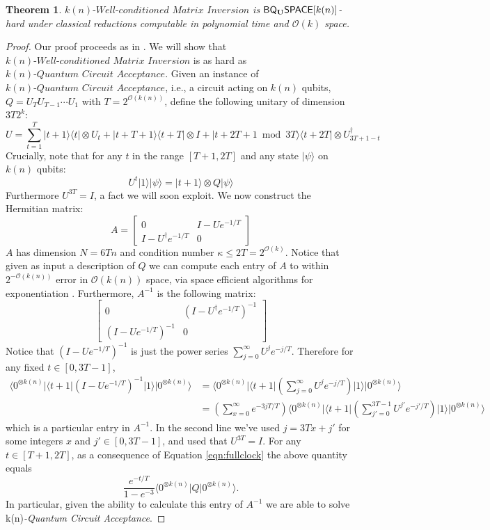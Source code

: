 \documentclass[11pt]{article}
\newtheorem{theorem}{Theorem}
\theoremstyle{definition}
\theoremstyle{remark}
\theoremstyle{definition}
\newcommand\matrixinvert[1]{{\ensuremath{#1}}\textit{-Well-conditioned Matrix Inversion}}
\newcommand\qca[1]{#1\textit{-Quantum Circuit Acceptance}}
\newcommand{\zero}{\ensuremath{0^{\otimes{k(n)}}}}
\newcommand{\classfont}{\sf}
\newcommand{\Unitary}{\mathbf{U}}
\newcommand{\unitaryBQSPACE}[1]{{\classfont{BQ}_\Unitary\classfont{SPACE}}[#1]}
\newcommand\bigoh{\mathcal{O}}
\begin{document}
\begin{theorem}
$\matrixinvert{k(n)}$ is $\unitaryBQSPACE{k(n)}$-hard under classical reductions computable in polynomial time and $\bigoh (k)$ space.
\end{theorem}
\begin{proof}
Our proof proceeds as in \cite{HHL}.  We will show that $\matrixinvert{k(n)}$ is as hard as $\qca{k(n)}$.  Given an instance of $\qca{k(n)}$, i.e., a circuit acting on $k(n)$ qubits, $Q=U_TU_{T-1}\cdots U_1$ with $T = 2^{\mathcal{O}(k(n))}$, define the following unitary of dimension $3T2^k$:
\[U=\sum_{t=1}^{T}|t+1\rangle\langle t|\otimes U_t+|t+T+1\rangle\langle t+T|\otimes I+|t+2T+1\bmod{3T}\rangle\langle t+2T|\otimes U_{3T+1-t}^{\dagger}\]	
Crucially, note that for any $t$ in the range $[T+1,2T]$ and any state $|\psi\rangle$ on $k(n)$ qubits: 
\begin{equation}\label{eqn:fullclock}
	U^t|1\rangle|\psi\rangle=|t+1\rangle\otimes Q|\psi\rangle
\end{equation}
Furthermore $U^{3T}=I$, a fact we will soon exploit. We now construct the Hermitian matrix:
\begin{equation}
A=\begin{bmatrix}
    0 & I-Ue^{-1/T}\\
   I-U^{\dagger}e^{-1/T} &  0
\end{bmatrix}
\end{equation}
 $A$ has dimension $N=6Tn$ and condition number $\kappa\leq 2T=2^{\bigoh (k)}$.  Notice that given as input a description of $Q$ we can compute each entry of $A$ to within $2^{-\mathcal{O}(k(n))}$ error in $\mathcal{O}(k(n))$ space, via space efficient algorithms for exponentiation \cite{reif}.
   Furthermore, $A^{-1}$ is the following matrix:
\begin{equation}
\begin{bmatrix}
    0 & \left(I-U^\dagger e^{-1/T}\right)^{-1}\\
   \left(I-Ue^{-1/T}\right)^{-1} &  0
\end{bmatrix}
\end{equation}
 Notice that $\left(I-Ue^{-1/T}\right)^{-1}$ is just the power series $\sum_{j=0}^\infty U^j e^{-j/T}$. Therefore for any fixed $t \in [0,3T-1]$,
 \begin{align}
\langle\zero|\langle t+1|\left(I-Ue^{-1/T}\right)^{-1}|1\rangle|\zero\rangle
&=\langle\zero|\langle t+1|\left(\sum_{j=0}^\infty U^j e^{-j/T}\right)|1\rangle|\zero\rangle \\
&= \left( \sum_{x=0}^\infty e^{-3jT/T} \right) \langle\zero|\langle t+1|\left(\sum_{j'=0}^{3T-1} U^{j'} e^{-j'/T}\right)|1\rangle|\zero\rangle
\end{align}
which is a particular entry in $A^{-1}$. In the second line we've used $j = 3Tx + j'$ for some integers $x$ and $j' \in [0,3T-1]$, and used that $U^{3T}=I$.  For any $t \in [T+1,2T]$, as a consequence of Equation \ref{eqn:fullclock} the above quantity equals
\begin{equation}
\frac{e^{-t/T}}{1-e^{-3}}\langle\zero|Q|\zero\rangle.
\end{equation}
In particular, given the ability to calculate this entry of $A^{-1}$ we are able to solve \qca{k(n)}.
\end{proof}
\end{document}
